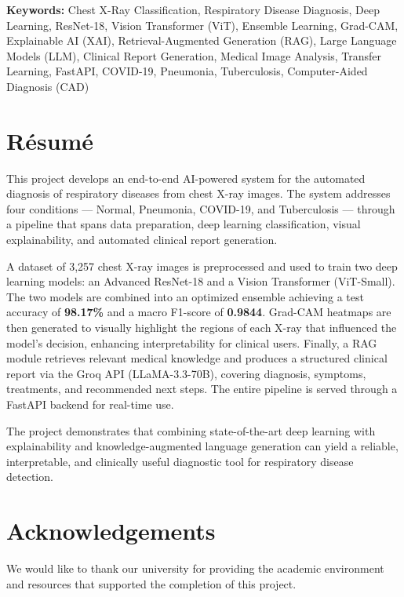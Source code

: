 \documentclass[12pt]{report}
\begin{document}
\vspace{0.5cm}

\noindent \textbf{Keywords:} Chest X-Ray Classification, Respiratory Disease Diagnosis, Deep Learning, ResNet-18, Vision Transformer (ViT), Ensemble Learning, Grad-CAM, Explainable AI (XAI), Retrieval-Augmented Generation (RAG), Large Language Models (LLM), Clinical Report Generation, Medical Image Analysis, Transfer Learning, FastAPI, COVID-19, Pneumonia, Tuberculosis, Computer-Aided Diagnosis (CAD)

\vspace{0.5cm}

\chapter*{R\'{e}sum\'{e}}
This project develops an end-to-end AI-powered system for the automated
diagnosis of respiratory diseases from chest X-ray images. The system
addresses four conditions --- Normal, Pneumonia, COVID-19, and Tuberculosis
--- through a pipeline that spans data preparation, deep learning
classification, visual explainability, and automated clinical report
generation.

A dataset of 3,257 chest X-ray images is preprocessed and used to train
two deep learning models: an Advanced ResNet-18 and a Vision Transformer
(ViT-Small). The two models are combined into an optimized ensemble
achieving a test accuracy of \textbf{98.17\%} and a macro F1-score of
\textbf{0.9844}. Grad-CAM heatmaps are then generated to visually highlight
the regions of each X-ray that influenced the model's decision, enhancing
interpretability for clinical users. Finally, a RAG module retrieves
relevant medical knowledge and produces a structured clinical report via
the Groq API (LLaMA-3.3-70B), covering diagnosis, symptoms, treatments,
and recommended next steps. The entire pipeline is served through a
FastAPI backend for real-time use.

The project demonstrates that combining state-of-the-art deep learning
with explainability and knowledge-augmented language generation can yield
a reliable, interpretable, and clinically useful diagnostic tool for
respiratory disease detection.

\chapter*{Acknowledgements}
We would like to thank our university for providing the academic
environment and resources that supported the completion of this project.
\end{document}
